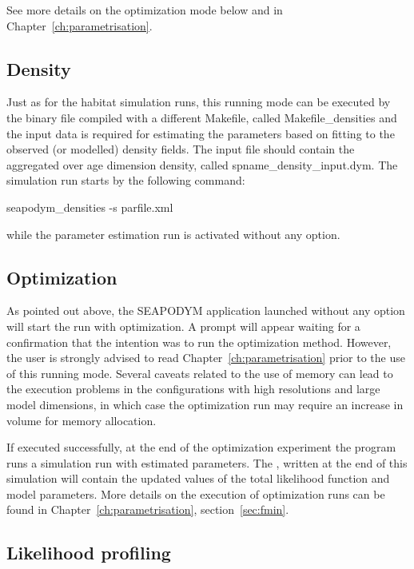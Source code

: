 \noindent See more details on the optimization mode below and in Chapter~\ref{ch:parametrisation}.

\subsection{Density} \label{sec:density-run}
Just as for the habitat simulation runs, this running mode can be executed by the binary file compiled with a different Makefile, called {\ttfamily Makefile\_densities} and the input data is required for estimating the parameters based on fitting to the observed (or modelled) density fields. The input file should contain the aggregated over age dimension density, called {\ttfamily spname\_density\_input.dym}. The simulation run starts by the following command:

\vspace{0.35cm}
{\ttfamily
  seapodym\_densities -s parfile.xml\\
}

\noindent while the parameter estimation run is activated without any option.

\subsection{Optimization}\label{sec:optimization-run}
As pointed out above, the SEAPODYM application launched without any option will start the run with optimization. A prompt will appear waiting for a confirmation that the intention was to run the optimization method. However, the user is strongly advised to read Chapter~\ref{ch:parametrisation} prior to the use of this running mode. Several caveats related to the use of memory can lead to the execution problems in the configurations with high resolutions and large model dimensions, in which case the optimization run may require an increase in volume for memory allocation. 

If executed successfully, at the end of the optimization experiment the program runs a simulation run with estimated parameters. The {}, written at the end of this simulation will contain the updated values of the total likelihood function and model parameters. More details on the execution of optimization runs can be found in Chapter~\ref{ch:parametrisation}, section~\ref{sec:fmin}.

\subsection{Likelihood profiling}\label{sec:profiling-run}

